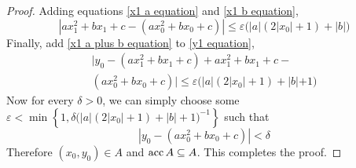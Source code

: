 \documentclass[../../main.tex]{subfiles}
\begin{document}
\begin{proof}
    Adding equations \eqref{x1 a equation} and \eqref{x1 b equation},
    \begin{equation}\label{x1 a plus b equation}
    \left|ax_1^2+bx_1+c - (ax_0^2 + bx_0 + c)\right|\leq \varepsilon\biggl(|a|(2|x_0|+1) + |b|\biggr)
    \end{equation}
    Finally, add \eqref{x1 a plus b equation} to \eqref{y1 equation},
    \begin{multline}
    |y_0-(ax_1^2+bx_1+c) + ax_1^2+bx_1+c - \\
    (ax_0^2 + bx_0 + c)|\leq \varepsilon\biggl(|a|(2|x_0|+1) + |b|+1\biggr)
    \end{multline}
    Now for every $\delta>0$, we can simply choose some $\varepsilon<\min\left\{1,\delta\biggl(|a|(2|x_0|+1)+|b|+1\biggr)^{-1}\right\}$ such that
    \[
    |y_0 - (ax_0^2 + bx_0 + c)|<\delta
    \]
    Therefore $(x_0,y_0)\in A$ and $\operatorname{acc}{A}\subseteq A$. This completes the proof.
\end{proof}
\end{document}
